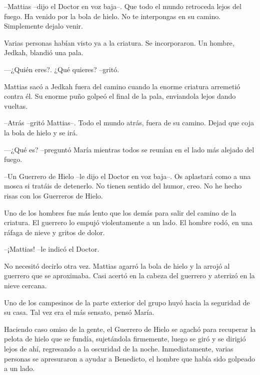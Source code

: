 --Mattias --dijo el Doctor en voz baja--. Que todo el mundo retroceda lejos del fuego. Ha venido por la bola de hielo. No te interpongas en su camino. Simplemente dejalo venir. 



Varias personas habían visto ya a la criatura. Se incorporaron. Un hombre, Jedkah, blandió una pala. 


—¿Quién eres?. ¿Qué quieres? --gritó.



Mattias sacó a Jedkah fuera del camino cuando la enorme criatura arremetió contra él. Su enorme puño golpeó el final de la pala, enviandola lejos dando vueltas.



--Atrás --gritó Mattias--. Todo el mundo atrás, fuera de su camino. Dejad que coja la bola de hielo y se irá. 



—¿Qué es? --preguntó María mientras todos se reunían en el lado más alejado del fuego.



--Un Guerrero de Hielo --le dijo el Doctor en voz baja--. Os aplastará como a una mosca si tratáis de detenerlo. No tienen sentido del humor, creo. No he hecho risas con los Guerreros de Hielo.



Uno de los hombres fue más lento que los demás para salir del camino de la criatura. El guerrero lo empujó violentamente a un lado. El hombre rodó, en una ráfaga de nieve y gritos de dolor.



--¡Mattias! --le indicó el Doctor.



No necesitó decirlo otra vez. Mattias agarró la bola de hielo y la arrojó al guerrero que se aproximaba. Casi acertó en la cabeza del guerrero y aterrizó en la nieve cercana.



Uno de los campesinos de la parte exterior del grupo huyó hacia la seguridad de su casa. Tal vez era el más sensato, pensó María.



Haciendo caso omiso de la gente, el Guerrero de Hielo se agachó para recuperar la pelota de hielo que se fundía, sujetándola firmemente, luego se giró y se dirigió lejos de ahí, regresando a la oscuridad de la noche. Inmediatamente, varias personas se apresuraron a ayudar a Benedicto, el hombre que había sido golpeado a un lado.



